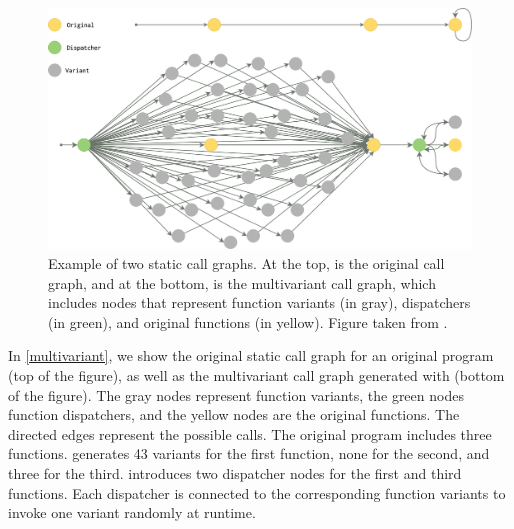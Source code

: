 \begin{figure}
    \centering
  \includegraphics[width=.8\linewidth]{diagrams/CFG.png}
  \caption{Example of two static call graphs. At the top, is the original call graph, and at the bottom, is the multivariant call graph, which includes nodes that represent function variants (in gray), dispatchers (in green), and original functions  (in yellow). Figure taken from \cite{Lic}.
}
  \label{multivariant}
\end{figure}

In \autoref{multivariant}, we show the original static call graph for an original program (top of the figure), as well as the multivariant call graph generated with \tool (bottom of the figure).
The gray nodes represent function variants, the green nodes function dispatchers, and the yellow nodes are the original functions.
The directed edges represent the possible calls.
The original program includes three functions. \tool generates 43 variants for the first function, none for the second, and three for the third. 
\tool introduces two dispatcher nodes for the first and third functions. Each dispatcher is connected to the corresponding function variants to invoke one variant randomly at runtime.


\lstset{
    language=llvm,
    basicstyle=\footnotesize\ttfamily,
    columns=fullflexible,
    breaklines=true,
    numbers=none,
    stepnumber=1,
    float
}

